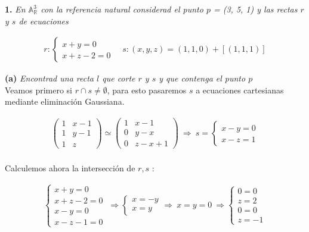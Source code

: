 \textbf{1. } \textit{En $\mathbb{A}^{3}_\mathbb{R}$ con la referencia natural considerad el punto $p$ = (3, 5, 1) y las rectas $r$ y $s$ de ecuaciones}

\begin{gather*}
    r : 
    \begin{cases}
    x + y = 0 \\
    x + z - 2 = 0
    \end{cases}
    \quad
    s : (x, y, z) = (1, 1, 0) + [(1, 1, 1)]
\end{gather*}

\textbf{(a) } \textit{Encontrad una recta $l$ que corte $r$ y $s$ y que contenga el punto $p$} \\

Veamos primero si $r \cap s \neq \emptyset$, para esto pasaremos $s$ a ecuaciones cartesianas mediante eliminación Gaussiana.

\begin{gather*}
    \begin{pmatrix}
    1 & x - 1 \\
    1 & y - 1 \\ 
    1 & z
    \end{pmatrix}
    \simeq
    \begin{pmatrix}
    1 & x - 1 \\
    0 & y - x\\ 
    0 & z - x + 1
    \end{pmatrix}
    \ \Longrightarrow \
    s = 
    \begin{cases}
    x - y = 0 \\
    x - z = 1
    \end{cases}
\end{gather*}
\\

Calculemos ahora la intersección de $r, s$ : 

\begin{gather*}
    \begin{cases}
    x + y = 0 \\
    x + z - 2 = 0 \\
    x - y = 0 \\
    x - z - 1 = 0
    \end{cases}
    \ \Longrightarrow
    \begin{cases}
    x = -y \\
    x = y
    \end{cases}
    \Longrightarrow \ x = y = 0 \ \Longrightarrow
    \begin{cases}
    0 = 0 \\
    z = 2 \\
    0 = 0 \\
    z = -1
    \end{cases}
\end{gather*}

